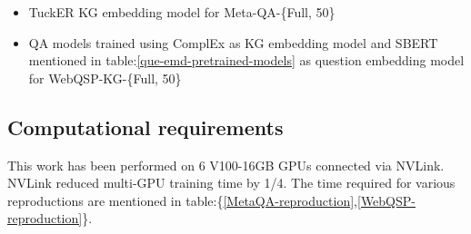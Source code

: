 \begin{itemize}
    \item TuckER KG embedding model for Meta-QA-\{Full, 50\}
    \item QA models trained using ComplEx as KG embedding model and SBERT mentioned in table:\ref{que-emd-pretrained-models} as question embedding model for WebQSP-KG-\{Full, 50\}
\end{itemize}




\subsection{Computational requirements}

This work has been performed on 6 V100-16GB GPUs connected via NVLink. NVLink reduced multi-GPU training time by 1/4. The time required for various reproductions are mentioned in table:\{\ref{MetaQA-reproduction},\ref{WebQSP-reproduction}\}.


